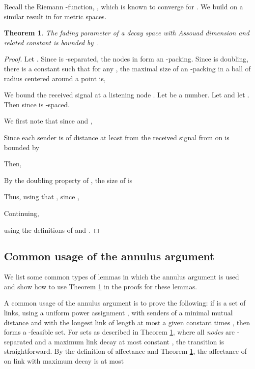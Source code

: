 \documentclass[11pt]{amsart}
\newcounter{foo}
\newtheorem{theorem}[foo]{Theorem}
\begin{document}
Recall the Riemann -function,  , which is known to converge for .
We build on a similar result in \cite{us:talg12} for metric spaces.



\begin{theorem}\label{annulusargument}
The fading parameter of a decay space   with Assouad
dimension  and related constant  is bounded by . 
\end{theorem}

\iffalse \begin{theorem}\label{annulusargument}
Let  be a set of nodes 
inducing decay space   with Assouad dimension .
If  is -separated, with ,
then the total interference on any node  in  is at most a constant  with respect to uniform power .
\end{theorem}
\fi

\begin{proof}
Let .
Since  is -separated, the nodes in  form an -packing.
Since  is doubling, there is a constant  such that  for any , 
the maximal size of an -packing in a ball of radius  centered around a point  is, 


We bound the received signal  at a listening node .
Let  be a number.
Let  and let .
Then  since  is -spaced.

We first note that since  and ,



Since each sender  is of distance at least  from 
the received signal from  on  is bounded by

Then,

By the doubling property of , the size of  is 
  
Thus, using that , since ,
  
Continuing,
  
using the definitions of  and .
\end{proof}



\subsection{Common usage of the annulus argument}
We list some common types of lemmas in which the annulus argument is used and show how to use Theorem \ref{annulusargument} in the proofs for these lemmas.

A common usage of the annulus argument is to prove the following: if
 is a set of links, using a uniform power assignment , with
senders of a minimal mutual distance  and with the longest link of
length at most a given constant times , then  forms a -feasible set. 
For sets as described in Theorem \ref{annulusargument}, where all
\emph{nodes} are -separated and a maximum link decay  at most
constant , the transition is straightforward.
By the definition of affectance and Theorem \ref{annulusargument}, 
the affectance of  on link  with maximum decay  is at most 
\end{document}
